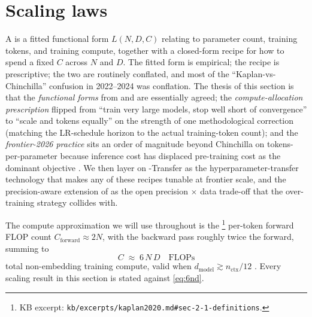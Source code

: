 
\section{Scaling laws}
\label{sec:scaling-laws}

A  is a fitted functional form $L(N, D, C)$ relating
 to parameter count, training tokens, and training
compute, together with a closed-form recipe for how to spend a fixed
$C$ across $N$ and $D$. The fitted form is empirical; the recipe is
prescriptive; the two are routinely conflated, and most of the
``Kaplan-vs-Chinchilla'' confusion in 2022--2024 was conflation. The
thesis of this section is that the \emph{functional forms} from
\citet{kaplan2020} and \citet{hoffmann2022-chinchilla} are essentially
agreed; the \emph{compute-allocation prescription} flipped from
``train very large models, stop well short of convergence''
\citep[\S 1.1]{kaplan2020} to ``scale  and tokens equally''
\citep[\S 3.4]{hoffmann2022-chinchilla} on the strength of one
methodological correction (matching the LR-schedule horizon to the
actual training-token count); and the \emph{frontier-2026 practice}
sits an order of magnitude beyond Chinchilla on tokens-per-parameter
because inference cost has displaced pre-training cost as the dominant
objective \citep[\S 3.2]{deepseek-v3}. We then layer on
\textmu-Transfer \citep{yang2022-mup} as the hyperparameter-transfer
technology that makes any of these recipes tunable at frontier scale,
and the precision-aware extension of
\citet{scaling-laws-precision-2024} as the open precision $\times$ data
trade-off that the over-training strategy collides with.

The compute approximation we will use throughout is the
\citet[\S 2.1, eq.\ 2.1]{kaplan2020}\footnote{KB excerpt:
\texttt{kb/excerpts/kaplan2020.md\#sec-2-1-definitions}.} per-token
forward FLOP count $C_{\text{forward}} \approx 2N$, with the backward
pass roughly twice the forward, summing to
\begin{equation}
C \;\approx\; 6\,N\,D \quad \text{FLOPs}
\label{eq:6nd}
\end{equation}
total non-embedding training compute, valid when $d_{\text{model}}
\gtrsim n_{\text{ctx}}/12$ \citep[\S 2.1]{kaplan2020}. Every scaling
result in this section is stated against \cref{eq:6nd}.

